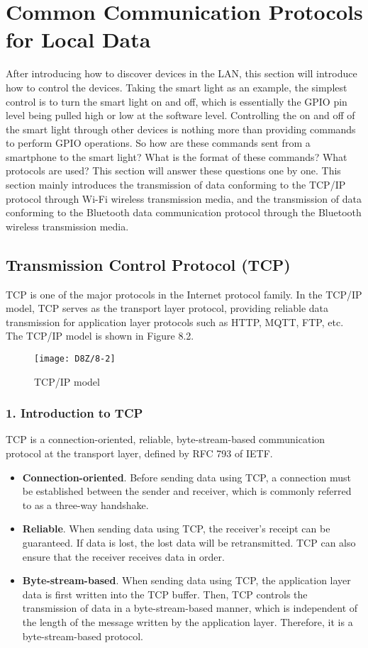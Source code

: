 \documentclass[a4paper,12pt]{book}
\begin{document}
\section{Common Communication Protocols for Local Data}
After introducing how to discover devices in the LAN, this section will introduce how to control the devices. Taking the smart light as an example, the simplest control is to turn the smart light on and off, which is essentially the GPIO pin level being pulled high or low at the software level. Controlling the on and off of the smart light through other devices is nothing more than providing commands to perform GPIO operations. So how are these commands sent from a smartphone to the smart light? What is the format of these commands? What protocols are used? This section will answer these questions one by one. This section mainly introduces the transmission of data conforming to the TCP/IP protocol through Wi-Fi wireless transmission media, and the transmission of data conforming to the Bluetooth data communication protocol through the Bluetooth wireless transmission media.

\subsection{Transmission Control Protocol (TCP)}

TCP is one of the major protocols in the Internet protocol family. In the TCP/IP model, TCP serves as the transport layer protocol, providing reliable data transmission for application layer protocols such as HTTP, MQTT, FTP, etc. The TCP/IP model is shown in Figure 8.2.

\begin{figure}[!h]
    \centering
    \texttt{[image: D8Z/8-2]}
    \caption{TCP/IP model}
\end{figure}

\subsubsection{1. Introduction to TCP}
TCP is a connection-oriented, reliable, byte-stream-based communication protocol at the transport layer, defined by RFC 793 of IETF.

\begin{itemize}[leftmargin=1.5em]
    \item \textbf{Connection-oriented}. Before sending data using TCP, a connection must be established between the sender and receiver, which is commonly referred to as a three-way handshake.
    \item \textbf{Reliable}. When sending data using TCP, the receiver’s receipt can be guaranteed. If data is lost, the lost data will be retransmitted. TCP can also ensure that the receiver receives data in order.
    \item \textbf{Byte-stream-based}. When sending data using TCP, the application layer data is first written into the TCP buffer. Then, TCP controls the transmission of data in a byte-stream-based manner, which is independent of the length of the message written by the application layer. Therefore, it is a byte-stream-based protocol.
\end{itemize}
\end{document}
